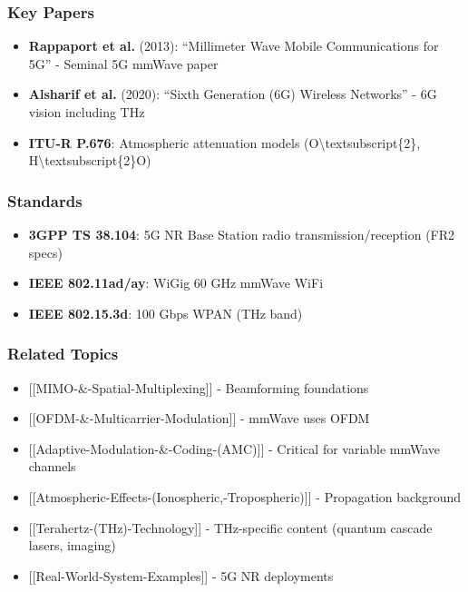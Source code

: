 \subsubsection{Key Papers}\label{key-papers}

\begin{itemize}
\tightlist
\item
  \textbf{Rappaport et al.} (2013): ``Millimeter Wave Mobile
  Communications for 5G'' - Seminal 5G mmWave paper
\item
  \textbf{Alsharif et al.} (2020): ``Sixth Generation (6G) Wireless
  Networks'' - 6G vision including THz
\item
  \textbf{ITU-R P.676}: Atmospheric attenuation models
  (O\textbackslash textsubscript\{2\},
  H\textbackslash textsubscript\{2\}O)
\end{itemize}

\subsubsection{Standards}\label{standards}

\begin{itemize}
\tightlist
\item
  \textbf{3GPP TS 38.104}: 5G NR Base Station radio
  transmission/reception (FR2 specs)
\item
  \textbf{IEEE 802.11ad/ay}: WiGig 60 GHz mmWave WiFi
\item
  \textbf{IEEE 802.15.3d}: 100 Gbps WPAN (THz band)
\end{itemize}

\subsubsection{Related Topics}\label{related-topics}

\begin{itemize}
\tightlist
\item
  {[}{[}MIMO-\&-Spatial-Multiplexing{]}{]} - Beamforming foundations
\item
  {[}{[}OFDM-\&-Multicarrier-Modulation{]}{]} - mmWave uses OFDM
\item
  {[}{[}Adaptive-Modulation-\&-Coding-(AMC){]}{]} - Critical for
  variable mmWave channels
\item
  {[}{[}Atmospheric-Effects-(Ionospheric,-Tropospheric){]}{]} -
  Propagation background
\item
  {[}{[}Terahertz-(THz)-Technology{]}{]} - THz-specific content (quantum
  cascade lasers, imaging)
\item
  {[}{[}Real-World-System-Examples{]}{]} - 5G NR deployments
\end{itemize}

